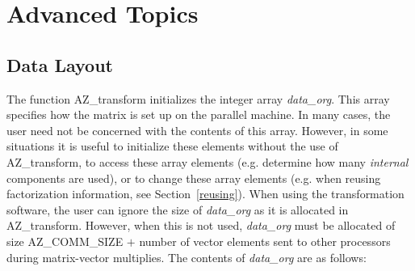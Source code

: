 \section{Advanced Topics\label{advanced_topics}}
\subsection{Data Layout\label{comm_vars}}
The \Az{} function {\sf AZ\_transform} initializes the integer array {\it
  data\_org}.  This array specifies how the matrix is set up on the parallel
machine.  In many cases, the user need not be concerned with the contents of
this array. However, in some situations it is useful to initialize these
elements without the use of {\sf AZ\_transform}, to access these array elements
(e.g. determine how many {\it internal} components are used), or to change
these array elements (e.g. when reusing factorization information, see
Section~\ref{reusing}). When using the transformation software, the user can
ignore the size of {\it data\_org} as it is allocated in {\sf AZ\_transform}.
However, when this is not used, {\it data\_org} must be allocated of size {\sf
  AZ\_COMM\_SIZE} $+$ number of vector elements sent to other processors during
matrix-vector multiplies.  The contents of {\it data\_org} are as follows:
\vspace{2em} { \hrulefill}
\nopagebreak \\[0.5em]
%
%
%
%
%
%
